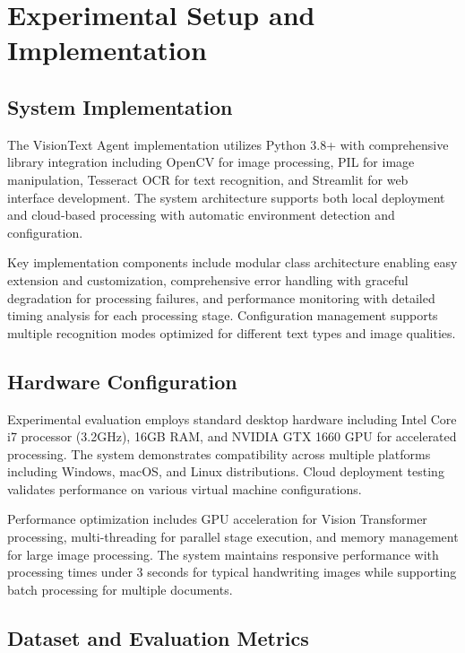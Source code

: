 \documentclass[10pt,twocolumn]{article}
\begin{document}
\section{\large Experimental Setup and Implementation}

\subsection{System Implementation}

The VisionText Agent implementation utilizes Python 3.8+ with comprehensive library integration including OpenCV for image processing, PIL for image manipulation, Tesseract OCR for text recognition, and Streamlit for web interface development. The system architecture supports both local deployment and cloud-based processing with automatic environment detection and configuration.

Key implementation components include modular class architecture enabling easy extension and customization, comprehensive error handling with graceful degradation for processing failures, and performance monitoring with detailed timing analysis for each processing stage. Configuration management supports multiple recognition modes optimized for different text types and image qualities.

\subsection{Hardware Configuration}

Experimental evaluation employs standard desktop hardware including Intel Core i7 processor (3.2GHz), 16GB RAM, and NVIDIA GTX 1660 GPU for accelerated processing. The system demonstrates compatibility across multiple platforms including Windows, macOS, and Linux distributions. Cloud deployment testing validates performance on various virtual machine configurations.

Performance optimization includes GPU acceleration for Vision Transformer processing, multi-threading for parallel stage execution, and memory management for large image processing. The system maintains responsive performance with processing times under 3 seconds for typical handwriting images while supporting batch processing for multiple documents.

\subsection{Dataset and Evaluation Metrics}
\end{document}

